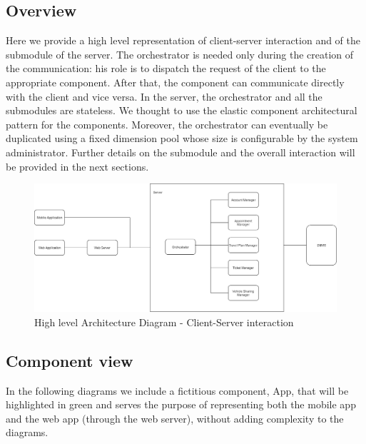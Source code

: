 \subsection{Overview}
	Here we provide a high level representation of client-server interaction and of the submodule of the server.
	The orchestrator is needed only during the creation of the communication: his role is to dispatch the request of the client to the appropriate component. After that, the component can communicate directly with the client and vice versa.\newline
	In the server, the orchestrator and all the submodules are stateless. We thought to use the elastic component architectural pattern for the components. Moreover, the orchestrator can eventually be duplicated using a fixed dimension pool whose size is configurable by the system administrator.\newline
	Further details on the submodule and the overall interaction will be provided in the next sections.

	\begin{figure}[H]
		\centerline{\includegraphics[width=0.9\paperwidth]{Images/HighLevelArchitecture}}
		\caption{High level Architecture Diagram - Client-Server interaction}
	\end{figure}

\filbreak
\subsection{Component view}
	In the following diagrams we include a fictitious component, App, that will be highlighted in green and serves the purpose of representing both the mobile app and the web app (through the web server), without adding complexity to the diagrams.
